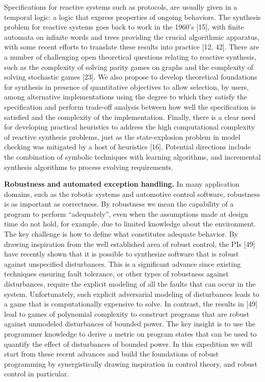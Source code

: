 Specifications for reactive systems such as protocols, are usually given in a temporal logic: a logic that express properties of ongoing behaviors. The synthesis problem for reactive systems goes back to work in the 1960’s [15], with finite automata on infinite words and trees providing the crucial algorithmic apparatus, with some recent efforts to translate these results into practice [12, 42]. There are a number of challenging open theoretical questions relating to reactive synthesis, such as the complexity of solving parity games on graphs and the complexity of solving stochastic games [23]. We also propose to develop theoretical foundations for synthesis in presence of quantitative objectives to allow selection, by users, among alternative implementations using the degree to which they satisfy the specification and perform trade-off analysis between how well the specification is satisfied and the complexity of the implementation. Finally, there is a clear need for developing practical heuristics to address the high computational complexity of reactive synthesis problems, just as the state-explosion problem in model checking was mitigated by a host of heuristics [16]. Potential directions include the combination of symbolic techniques with learning algorithms, and incremental synthesis algorithms to process evolving requirements.


\textbf{Robustness and automated exception handling.} In many application domains, such as the robotic systems and automotive control software, robustness is as important as correctness. By robustness we mean the capability of a program to perform “adequately”, even when the assumptions made at design time do not hold, for example, due to limited knowledge about the environment. The key challenge is how to define what constitutes adequate behavior. By drawing inspiration from the well established area of robust control, the PIs [49] have recently shown that it is possible to synthesize software that is robust against unspecified disturbances. This is a significant advance since existing techniques ensuring fault tolerance, or other types of robustness against disturbances, require the explicit modeling of all the faults that can occur in the system. Unfortunately, such explicit adversarial modeling of disturbances leads to a game that is computationally expensive to solve. In contrast, the results in [49] lead to games of polynomial complexity to construct programs that are robust against unmodeled disturbances of bounded power. The key insight is to use the programmer knowledge to derive a metric on program states that can be used to quantify the effect of disturbances of bounded power. In this expedition we will start from these recent advances and build the foundations of robust programming by synergistically drawing inspiration in control theory, and robust control in particular.

